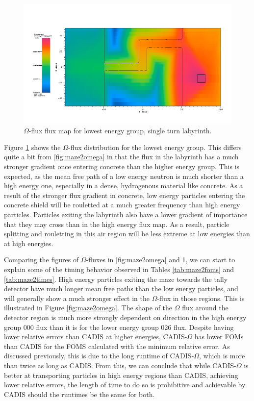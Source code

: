 \begin{figure}[h!]
  \centering
    \includegraphics[width=0.9\linewidth]{./chapters/characterization_probs/figures/char/maze2/maze2MomegaG26.png}
    \caption{$\Omega$-flux flux map for lowest energy group, single turn
    labyrinth.}
    \label{fig:maze2omega26}
\end{figure}

Figure \ref{fig:maze2omega26} shows the $\Omega$-flux distribution for the
lowest energy group. This differs quite a bit from \ref{fig:maze2omega} in that
the flux in the labyrinth has a much stronger gradient once entering concrete
than the higher energy group. This is expected, as the mean free path of a low
energy neutron is much shorter than a high energy one, especially in a dense,
hydrogenous material like concrete. As a result of the stronger flux gradient in
concrete, low energy particles entering
the concrete shield will be rouletted at a much greater frequency than high
energy particles. Particles exiting the labyrinth also have a lower gradient of
importance that they may cross than in the high energy flux map. As a result,
particle splitting and rouletting in this air region will be less extreme at low
energies than at high energies.

Comparing the figures of $\Omega$-fluxes in \ref{fig:maze2omega} and
\ref{fig:maze2omega26}, we can start to explain some of the timing behavior
observed in Tables \ref{tab:maze2foms} and \ref{tab:maze2times}.
High energy particles exiting the maze towards the tally
detector have much longer mean free paths than the low energy particles, and
will generally show a much stronger effect in the $\Omega$-flux in those
regions. This is illustrated in Figure \ref{fig:maze2omega}.
The shape of the $\Omega$
flux around the detector region is much more strongly dependent on direction in
the high energy group 000 flux than it is for the lower energy group 026 flux.
Despite having lower relative errors than CADIS at higher energies,
CADIS-$\Omega$ has lower FOMs than CADIS for the FOMS calculated with the
minimum relative error. As discussed previously, this is due to the long runtime
of CADIS-$\Omega$, which is more than twice as long as CADIS. From this, we can
conclude that while CADIS-$\Omega$ is better at transporting particles in high
energy regions than CADIS, achieving lower relative errors, the length of time
to do so is prohibitive and achievable by CADIS should the runtimes be the same
for both.

